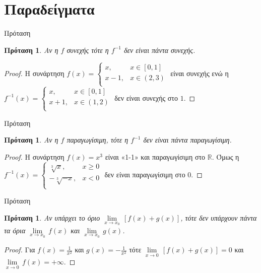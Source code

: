 \documentclass[greek]{beamer}
\newtheorem{proposition}[theorem]{Πρόταση}
\begin{document}
\section{Παραδείγματα}
\begin{frame}{Πρόταση}
 \begin{proposition}
  \normalfont Αν η $f$ συνεχής τότε η $f^{-1}$ δεν είναι πάντα συνεχής.
 \end{proposition}
 \begin{proof}
  Η συνάρτηση $f\left( x \right)=\left\{ \begin{array}{*{35}{l}}
    x,   & x\in \left[ 0,1 \right] \\
    x-1, & x\in \left( 2,3 \right) \\
   \end{array} \right.$ είναι συνεχής ενώ η ${{f}^{-1}}\left( x \right)=\left\{ \begin{array}{*{35}{l}}
    x,   & x\in \left[ 0,1 \right] \\
    x+1, & x\in \left( 1,2 \right) \\
   \end{array} \right.$ δεν είναι συνεχής στο $1$.
 \end{proof}
\end{frame}

\begin{frame}{Πρόταση}
 \begin{proposition}
  \normalfont Αν η $f$ παραγωγίσιμη, τότε η $f^{-1}$ δεν είναι πάντα παραγωγίσιμη.
 \end{proposition}
 \begin{proof}
  Η συνάρτηση $f\left( x \right)={{x}^{3}}$ είναι «1-1» και παραγωγίσιμη στο $\mathbb{R}$. Όμως η ${{f}^{-1}}\left( x \right)=\left\{ \begin{array}{*{35}{l}}
    \sqrt[3]{x},   & x\ge 0 \\
    -\sqrt[3]{-x}, & x<0    \\
   \end{array} \right.$ δεν είναι παραγωγίσιμη στο 0.
 \end{proof}
\end{frame}

\begin{frame}{Πρόταση}
 \begin{proposition}
  \normalfont Αν υπάρχει το όριο $\underset{x\to {{x}_{0}}}{\mathop{\lim }}\,\left[ f\left( x \right)+g\left( x \right) \right]$, τότε δεν υπάρχουν πάντα τα όρια $\underset{x\to {{x}_{0}}}{\mathop{\lim }}\,f\left( x \right)$ και $\underset{x\to {{x}_{0}}}{\mathop{\lim }}\,g\left( x \right)$.
 \end{proposition}
 \begin{proof}
  Για $f\left( x \right)=\frac{1}{{{x}^{2}}}$ και $g\left( x \right)=-\frac{1}{{{x}^{2}}}$ τότε $\underset{x\to 0}{\mathop{\lim }}\,\left[ f\left( x \right)+g\left( x \right) \right]=0$ και $\underset{x\to 0}{\mathop{\lim }}\,f\left( x \right)=+\infty $.
 \end{proof}
\end{frame}
\end{document}
